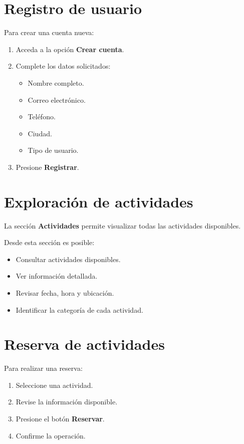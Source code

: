 \documentclass[12pt,a4paper]{article}
\begin{document}
\section{Registro de usuario}

Para crear una cuenta nueva:

\begin{enumerate}
\item Acceda a la opción \textbf{Crear cuenta}.
\item Complete los datos solicitados:
\begin{itemize}
\item Nombre completo.
\item Correo electrónico.
\item Teléfono.
\item Ciudad.
\item Tipo de usuario.
\end{itemize}
\item Presione \textbf{Registrar}.
\end{enumerate}

\section{Exploración de actividades}

La sección \textbf{Actividades} permite visualizar todas las actividades disponibles.

Desde esta sección es posible:

\begin{itemize}
\item Consultar actividades disponibles.
\item Ver información detallada.
\item Revisar fecha, hora y ubicación.
\item Identificar la categoría de cada actividad.
\end{itemize}

\section{Reserva de actividades}

Para realizar una reserva:

\begin{enumerate}
\item Seleccione una actividad.
\item Revise la información disponible.
\item Presione el botón \textbf{Reservar}.
\item Confirme la operación.
\end{enumerate}
\end{document}
